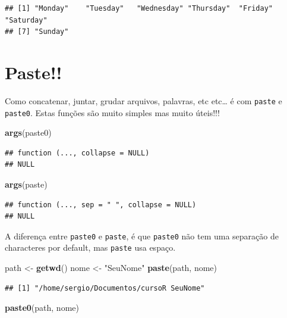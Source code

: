\documentclass[]{book}
\newenvironment{Shaded}{\begin{snugshade}}{\end{snugshade}}
\newcommand{\KeywordTok}[1]{\textcolor[rgb]{0.13,0.29,0.53}{\textbf{#1}}}
\newcommand{\StringTok}[1]{\textcolor[rgb]{0.31,0.60,0.02}{#1}}
\newcommand{\NormalTok}[1]{#1}
\theoremstyle{definition}
\theoremstyle{definition}
\theoremstyle{definition}
\theoremstyle{remark}
\begin{document}
\begin{verbatim}
## [1] "Monday"    "Tuesday"   "Wednesday" "Thursday"  "Friday"    "Saturday" 
## [7] "Sunday"
\end{verbatim}

\section{Paste!!}\label{paste}

Como concatenar, juntar, grudar arquivos, palavras, etc etc\ldots{} é
com \texttt{paste} e \texttt{paste0}. Estas funções são muito simples
mas muito úteis!!!

\begin{Shaded}
\begin{Highlighting}[]
\KeywordTok{args}\NormalTok{(paste0)}
\end{Highlighting}
\end{Shaded}

\begin{verbatim}
## function (..., collapse = NULL) 
## NULL
\end{verbatim}

\begin{Shaded}
\begin{Highlighting}[]
\KeywordTok{args}\NormalTok{(paste)}
\end{Highlighting}
\end{Shaded}

\begin{verbatim}
## function (..., sep = " ", collapse = NULL) 
## NULL
\end{verbatim}

A diferença entre \texttt{paste0} e \texttt{paste}, é que
\texttt{paste0} não tem uma separação de characteres por default, mas
\texttt{paste} usa espaço.

\begin{Shaded}
\begin{Highlighting}[]
\NormalTok{path <-}\StringTok{ }\KeywordTok{getwd}\NormalTok{()}
\NormalTok{nome <-}\StringTok{ "SeuNome"}
\KeywordTok{paste}\NormalTok{(path, nome)}
\end{Highlighting}
\end{Shaded}

\begin{verbatim}
## [1] "/home/sergio/Documentos/cursoR SeuNome"
\end{verbatim}

\begin{Shaded}
\begin{Highlighting}[]
\KeywordTok{paste0}\NormalTok{(path, nome)}
\end{Highlighting}
\end{Shaded}
\end{document}
